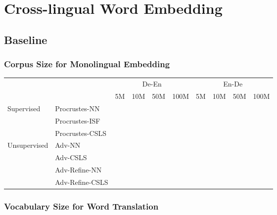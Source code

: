 \section{Cross-lingual Word Embedding}
\subsection{Baseline}
\subsubsection{Corpus Size for Monolingual Embedding}
\begin{table}[H]
	\begin{tabular}{llcccccccc}
		\hline
		\multicolumn{2}{c}{\multirow{2}{*}{}}          & \multicolumn{4}{c}{De-En} & \multicolumn{4}{c}{En-De} \\ \cline{3-10} 
		\multicolumn{2}{c}{}                           & 5M        & 10M        & 50M        & 100M       & 5M        & 10M        & 50M        & 100M       \\ \hline
		\multirow{3}{*}{Supervised}   & Procrustes-NN   &           &            &            &            &           &            &            &            \\ \cline{2-10} 
		& Procrustes-ISF  &           &            &            &            &           &            &            &            \\ \cline{2-10} 
		& Procrustes-CSLS &           &            &            &            &           &            &            &            \\ \hline
		\multirow{4}{*}{Unsupervised} & Adv-NN          &           &            &            &            &           &            &            &            \\ \cline{2-10} 
		& Adv-CSLS        &           &            &            &            &           &            &            &            \\ \cline{2-10} 
		& Adv-Refine-NN   &           &            &            &            &           &            &            &            \\ \cline{2-10} 
		& Adv-Refine-CSLS &           &            &            &            &           &            &            &            \\ \hline
	\end{tabular}
\end{table}

\subsubsection{Vocabulary Size for Word Translation}

